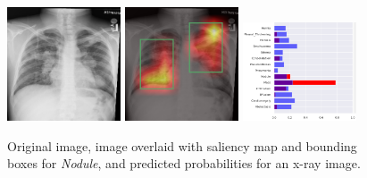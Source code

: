 \documentclass[8pt]{beamer}
\begin{document}
\begin{frame}
\begin{figure}[H]
  \centering
  \includegraphics[width=0.3\textwidth]{images/preds/nodule}\hspace{0.01\textwidth}%
  \includegraphics[width=0.3\textwidth]{images/preds/nodule_cam}\hspace{0.01\textwidth}%
  \includegraphics[width=0.3\textwidth]{images/preds/nodule_probs}\\[0.01\textwidth]
  \caption{Original image, image overlaid with saliency map and bounding boxes
    for \emph{Nodule}, and predicted probabilities for an x-ray image.}
  \label{examples_6}
\end{figure}
\end{frame}
\end{document}
